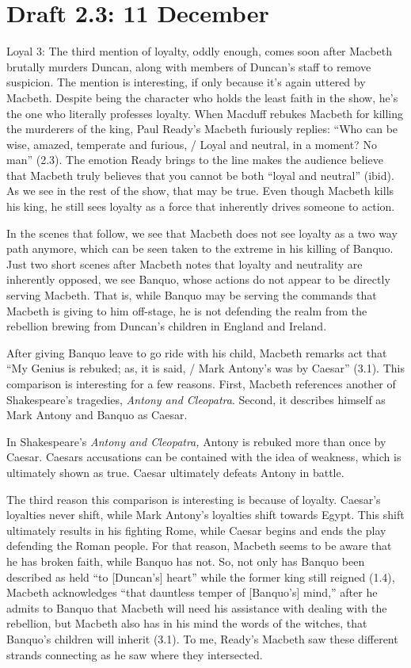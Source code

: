 \documentclass[12pt]{article}[titlepage]
\newcommand{\say}[1]{``#1''}
\newcommand{\1}{\={a}}
\newcommand{\2}{\={e}}
\newcommand{\3}{\={\i}}
\newcommand{\4}{\=o}
\newcommand{\5}{\=u}
\newcommand{\6}{\={A}}
\renewcommand{\,}{\textsuperscript{,}}
\begin{document}
\section{Draft 2.3: 11 December}
Loyal 3:
The third mention of loyalty, oddly enough, comes soon after Macbeth brutally murders Duncan, along with members of Duncan's staff to remove suspicion.
The mention is interesting, if only because it's again uttered by Macbeth.
Despite being the character who holds the least faith in the show, he's the one who literally professes loyalty.
When Macduff rebukes Macbeth for killing the murderers of the king, Paul Ready's Macbeth furiously replies: \say{Who can be wise, amazed, temperate and furious, / Loyal and neutral, in a moment? No man} (2.3).
The emotion Ready brings to the line makes the audience believe that Macbeth truly believes that you cannot be both \say{loyal and neutral} (ibid).
As we see in the rest of the show, that may be true.
Even though Macbeth kills his king, he still sees loyalty as a force that inherently drives someone to action.

In the scenes that follow, we see that Macbeth does not see loyalty as a two way path anymore, which can be seen taken to the extreme in his killing of Banquo.
Just two short scenes after Macbeth notes that loyalty and neutrality are inherently opposed, we see Banquo, whose actions do not appear to be directly serving Macbeth.
That is, while Banquo may be serving the commands that Macbeth is giving to him off-stage, he is not defending the realm from the rebellion brewing from Duncan's children in England and Ireland.

After giving Banquo leave to go ride with his child, Macbeth remarks act that \say{My Genius is rebuked; as, it is said, / Mark Antony's was by Caesar} (3.1).
This comparison is interesting for a few reasons.
First, Macbeth references another of Shakespeare's tragedies, \textit{Antony and Cleopatra}.
Second, it describes himself as Mark Antony and Banquo as Caesar.

In Shakespeare's \textit{Antony and Cleopatra,} Antony is rebuked more than once by Caesar.
Caesars accusations can be contained with the idea of weakness, which is ultimately shown as true.
Caesar ultimately defeats Antony in battle.

The third reason this comparison is interesting is because of loyalty.
Caesar's loyalties never shift, while Mark Antony's loyalties shift towards Egypt.
This shift ultimately results in his fighting Rome, while Caesar begins and ends the play defending the Roman people.
For that reason, Macbeth seems to be aware that he has broken faith, while Banquo has not.
So, not only has Banquo been described as held \say{to [Duncan's] heart} while the former king still reigned (1.4), Macbeth acknowledges \say{that dauntless temper of [Banquo's] mind,} after he admits to Banquo that Macbeth will need his assistance with dealing with the rebellion, but Macbeth also has in his mind the words of the witches, that Banquo's children will inherit (3.1).
To me, Ready's Macbeth saw these different strands connecting as he saw where they intersected.
\end{document}
